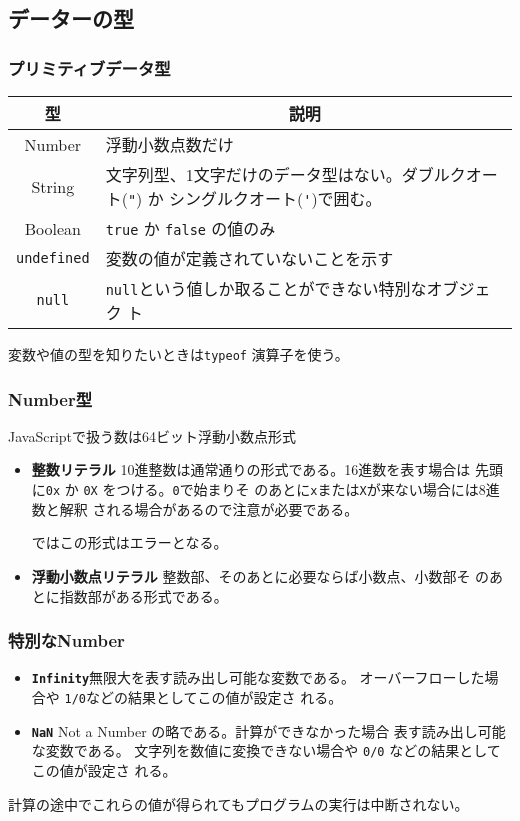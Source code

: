 \subsection{データーの型}
\begin{frame}[containsverbatim]
 \frametitle{プリミティブデータ型}
\begin{tabular}{|c|m{}|}\hline
 型&\multicolumn{1}{c|}{説明} \\\hline
 Number & 浮動小数点数だけ\\ \hline
 String & 文字列型、1文字だけのデータ型はない。ダブルクオート(\Verb+"+)
     か%
     シングルクオート(\Verb+'+)で囲む。\\ \hline
 Boolean& \Verb+true+ か \Verb+false+ の値のみ\\ \hline
 \Verb+undefined+ & 変数の値が定義されていないことを示す\\ \hline
 \Verb+null+& \Verb+null+という値しか取ることができない特別なオブジェク
     ト\\ \hline
\end{tabular}

変数や値の型を知りたいときは\Verb+typeof+ 演算子を使う。
\end{frame}
\begin{frame}[containsverbatim]
 \frametitle{Number型}
JavaScriptで扱う数は64ビット浮動小数点形式
\begin{itemize}
 \item{\bfseries 整数リテラル} 10進整数は通常通りの形式である。16進数を表す場合は
	      先頭に\Verb+0x+ か \Verb+0X+ をつける。\Verb+0+で始まりそ
	      のあとに\Verb+x+または\Verb+X+が来ない場合には8進数と解釈
      される場合があるので注意が必要である。

      \Strict ではこの形式はエラーとなる。
 \item{\bfseries 浮動小数点リテラル} 整数部、そのあとに必要ならば小数点、小数部そ
       のあとに指数部がある形式である。
\end{itemize}
\end{frame}
\begin{frame}[containsverbatim]
 \frametitle{特別なNumber}
\begin{itemize}
 \item {\bfseries \Verb+Infinity+}無限大を表す読み出し可能な変数である。
       オーバーフローした場合や \Verb+1/0+などの結果としてこの値が設定さ
       れる。
 \item {\bfseries \Verb+NaN+} Not a Number の略である。計算ができなかった場合
       表す読み出し可能な変数である。
       文字列を数値に変換できない場合や \Verb+0/0+ などの結果としてこの値が設定さ
       れる。
\end{itemize}
 計算の途中でこれらの値が得られてもプログラムの実行は中断されない。
\end{frame}
